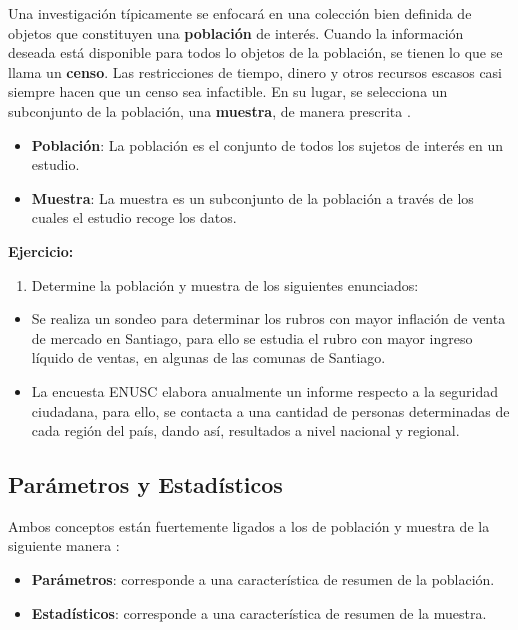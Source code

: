 \documentclass[
]{book}
\providecommand{\tightlist}{%
  \setlength{\itemsep}{0pt}\setlength{\parskip}{0pt}}
\begin{document}
Una investigación típicamente se enfocará en una colección bien definida de objetos que constituyen una \textbf{población} de interés. Cuando la información deseada está disponible para todos lo objetos de la población, se tienen lo que se llama un \textbf{censo}. Las restricciones de tiempo, dinero y otros recursos escasos casi siempre hacen que un censo sea infactible. En su lugar, se selecciona un subconjunto de la población, una \textbf{muestra}, de manera prescrita \citep[página 2]{Devore}.

\begin{itemize}
\tightlist
\item
  \textbf{Población}: La población es el conjunto de todos los sujetos de interés en un estudio.
\item
  \textbf{Muestra}: La muestra es un subconjunto de la población a través de los cuales el estudio recoge los datos.
\end{itemize}

\textbf{Ejercicio:}

\begin{enumerate}
\def\labelenumi{\arabic{enumi}.}
\tightlist
\item
  Determine la población y muestra de los siguientes enunciados:
\end{enumerate}

\begin{itemize}
\tightlist
\item
  Se realiza un sondeo para determinar los rubros con mayor inflación de venta de mercado en Santiago, para ello se estudia el rubro con mayor ingreso líquido de ventas, en algunas de las comunas de Santiago.
\item
  La encuesta ENUSC elabora anualmente un informe respecto a la seguridad ciudadana, para ello, se contacta a una cantidad de personas determinadas de cada región del país, dando así, resultados a nivel nacional y regional.
\end{itemize}

\hypertarget{paruxe1metros-y-estaduxedsticos}{%
\subsection{Parámetros y Estadísticos}\label{paruxe1metros-y-estaduxedsticos}}

Ambos conceptos están fuertemente ligados a los de población y muestra de la siguiente manera \citep[página 83]{anderson}:

\begin{itemize}
\tightlist
\item
  \textbf{Parámetros}: corresponde a una característica de resumen de la población.
\item
  \textbf{Estadísticos}: corresponde a una característica de resumen de la muestra.
\end{itemize}
\end{document}
